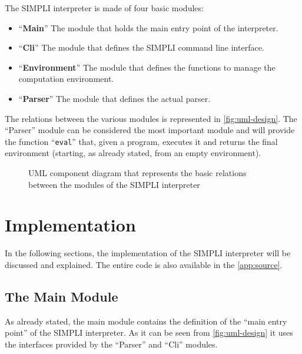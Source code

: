 \documentclass{esposito-documentation}
\begin{document}
The SIMPLI interpreter is made of four basic modules:
\begin{itemize}
	\item ``\textbf{Main}'' The module that holds the main entry point of the
		interpreter.
	\item ``\textbf{Cli}'' The module that defines the SIMPLI command line
		interface.
	\item ``\textbf{Environment}'' The module that defines the functions to
		manage the computation environment.
	\item ``\textbf{Parser}'' The module that defines the actual parser.
\end{itemize}
The relations between the various modules is represented in
\autoref{fig:uml-design}. The ``Parser'' module can be considered the most
important module and will provide the function ``\texttt{eval}'' that, given a
program, executes it and returns the final environment (starting, as already
stated, from an empty environment).

\begin{figure}[H]
	\centering
	\caption{UML component diagram that represents the basic relations between the modules of the SIMPLI interpreter}
	\label{fig:uml-design}
\end{figure}

\chapter{Implementation}

In the following sections, the implementation of the SIMPLI interpreter will be
discussed and explained. The entire code is also available in the
\autoref{app:source}.
\section{The Main Module}



As already stated, the main module contains the definition of the ``main entry
point'' of the SIMPLI interpreter. As it can be seen from
\autoref{fig:uml-design} it uses the interfaces provided by the ``Parser'' and
``Cli'' modules.
\end{document}
